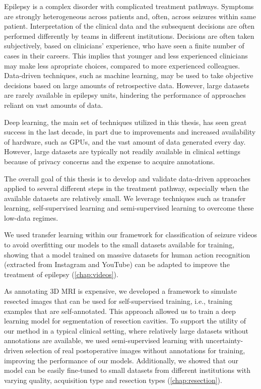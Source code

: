Epilepsy is a complex disorder with complicated treatment pathways.
Symptoms are strongly heterogeneous across patients and, often, across seizures within same patient.
Interpretation of the clinical data and the subsequent decisions are often performed differently by teams in different institutions.
Decisions are often taken subjectively, based on clinicians' experience, who have seen a finite number of cases in their careers.
This implies that younger and less experienced clinicians may make less apropriate choices, compared to more experienced colleagues.
Data-driven techniques, such as machine learning, may be used to take objective decisions based on large amounts of retrospective data.
However, large datasets are rarely available in epilepsy units, hindering the performance of approaches reliant on vast amounts of data.

Deep learning, the main set of techniques utilized in this thesis, has seen great success in the last decade, in part due to improvements and increased availability of hardware, such as \acp{GPU}, and the vast amount of data generated every day.
However, large datasets are typically not readily available in clinical settings because of privacy concerns and the expense to acquire annotations.

The overall goal of this thesis is to develop and validate data-driven approaches applied to several different steps in the treatment pathway, especially when the available datasets are relatively small.
We leverage techniques such as transfer learning, self-supervised learning and semi-supervised learning to overcome these low-data regimes.

We used transfer learning within our framework for classification of seizure videos to avoid overfitting our models to the small datasets available for training, showing that a model trained on massive datasets for human action recognition (extracted from Instagram and YouTube) can be adapted to improve the treatment of epilepsy (\cref{chap:videos}).

As annotating 3D \ac{MRI} is expensive, we developed a framework to simulate resected images that can be used for self-supervised training, i.e., training examples that are self-annotated.
This approach allowed us to train a deep learning model for segmentation of resection cavities.
To support the utility of our method in a typical clinical setting, where relatively large datasets without annotations are available, we used semi-supervised learning with uncertainty-driven selection of real postoperative images without annotations for training, improving the performance of our models.
Additionally, we showed that our model can be easily fine-tuned to small datasets from different institutions with varying quality, acquisition type and resection types (\cref{chap:resection}).

